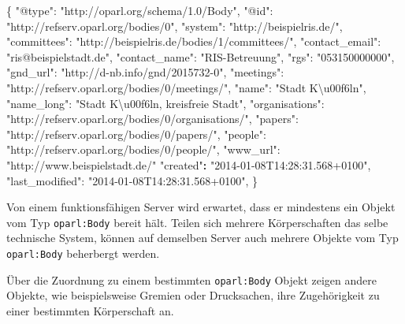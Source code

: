 \documentclass[,a4paper]{article}
\newenvironment{Shaded}{}{}
\newcommand{\DataTypeTok}[1]{\textcolor[rgb]{0.56,0.13,0.00}{{#1}}}
\newcommand{\StringTok}[1]{\textcolor[rgb]{0.25,0.44,0.63}{{#1}}}
\newcommand{\ErrorTok}[1]{\textcolor[rgb]{1.00,0.00,0.00}{\textbf{{#1}}}}
\newcommand{\NormalTok}[1]{{#1}}
\begin{document}
\begin{Shaded}
\begin{Highlighting}[]
\NormalTok{\{}
    \DataTypeTok{"@type"}\NormalTok{: }\StringTok{"http://oparl.org/schema/1.0/Body"}\NormalTok{,}
    \DataTypeTok{"@id"}\NormalTok{: }\StringTok{"http://refserv.oparl.org/bodies/0"}\NormalTok{,}
    \DataTypeTok{"system"}\NormalTok{: }\StringTok{"http://beispielris.de/"}\NormalTok{,}
    \DataTypeTok{"committees"}\NormalTok{: }\StringTok{"http://beispielris.de/bodies/1/committees/"}\NormalTok{,}
    \DataTypeTok{"contact_email"}\NormalTok{: }\StringTok{"ris@beispielstadt.de"}\NormalTok{,}
    \DataTypeTok{"contact_name"}\NormalTok{: }\StringTok{"RIS-Betreuung"}\NormalTok{,}
    \DataTypeTok{"rgs"}\NormalTok{: }\StringTok{"053150000000"}\NormalTok{,}
    \DataTypeTok{"gnd_url"}\NormalTok{: }\StringTok{"http://d-nb.info/gnd/2015732-0"}\NormalTok{,}
    \DataTypeTok{"meetings"}\NormalTok{: }\StringTok{"http://refserv.oparl.org/bodies/0/meetings/"}\NormalTok{,}
    \DataTypeTok{"name"}\NormalTok{: }\StringTok{"Stadt K\textbackslash{}u00f6ln"}\NormalTok{,}
    \DataTypeTok{"name_long"}\NormalTok{: }\StringTok{"Stadt K\textbackslash{}u00f6ln, kreisfreie Stadt"}\NormalTok{,}
    \DataTypeTok{"organisations"}\NormalTok{: }\StringTok{"http://refserv.oparl.org/bodies/0/organisations/"}\NormalTok{,}
    \DataTypeTok{"papers"}\NormalTok{: }\StringTok{"http://refserv.oparl.org/bodies/0/papers/"}\NormalTok{,}
    \DataTypeTok{"people"}\NormalTok{: }\StringTok{"http://refserv.oparl.org/bodies/0/people/"}\NormalTok{,}
    \DataTypeTok{"www_url"}\NormalTok{: }\StringTok{"http://www.beispielstadt.de/"}
    \StringTok{"created"}\ErrorTok{:} \StringTok{"2014-01-08T14:28:31.568+0100"}\NormalTok{,}
    \DataTypeTok{"last_modified"}\NormalTok{: }\StringTok{"2014-01-08T14:28:31.568+0100"}\NormalTok{,}
\NormalTok{\}}
\end{Highlighting}
\end{Shaded}

Von einem funktionsfähigen Server wird erwartet, dass er mindestens ein
Objekt vom Typ \texttt{oparl:Body} bereit hält. Teilen sich mehrere
Körperschaften das selbe technische System, können auf demselben Server
auch mehrere Objekte vom Typ \texttt{oparl:Body} beherbergt werden.

Über die Zuordnung zu einem bestimmten \texttt{oparl:Body} Objekt zeigen
andere Objekte, wie beispielsweise Gremien oder Drucksachen, ihre
Zugehörigkeit zu einer bestimmten Körperschaft an.
\end{document}
